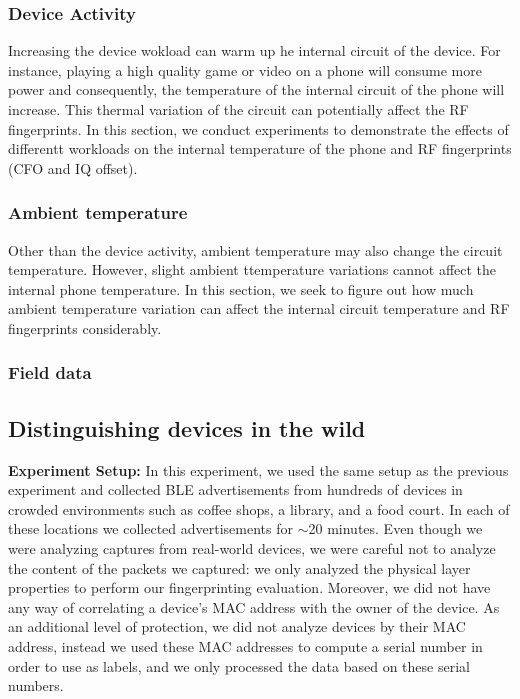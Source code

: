 \subsubsection*{Device Activity}
Increasing the device wokload can warm up he internal circuit of the device. For instance, playing a high quality game or video on a phone will consume more power and consequently, the temperature of the internal circuit of the phone will increase. This thermal variation of the circuit can potentially affect the RF fingerprints. In this section, we conduct experiments to demonstrate the effects of differentt workloads on the internal temperature of the phone and RF fingerprints (CFO and IQ offset).

\subsubsection*{Ambient temperature}
Other than the device activity, ambient temperature may also change the circuit temperature. However, slight ambient ttemperature variations cannot affect the internal phone temperature. In this section, we seek to figure out how much ambient temperature variation can affect the internal circuit temperature and RF fingerprints considerably. 

\subsubsection*{Field data}


\subsection{Distinguishing devices in the wild}
\label{sec:results:field}

\noindent\textbf{Experiment Setup:}
%
In this experiment, we used the same setup as the previous experiment and collected
	BLE advertisements from hundreds of devices in crowded environments such as
	coffee shops, a library, and a food court. In each of these locations we collected
	advertisements for $\sim$20 minutes.
%
Even though we were analyzing captures from real-world devices, we were careful
	not to analyze the content of the packets we captured: we only analyzed the
	physical layer properties to perform our fingerprinting evaluation. Moreover,
	we did not have any way of correlating a device's MAC address with the owner
	of the device. 
	As an
	additional level of protection, we did not analyze devices by their MAC
	address, instead we used these MAC addresses to compute a serial number in order to use as labels, and
	we only processed the data based on these serial numbers.
 
